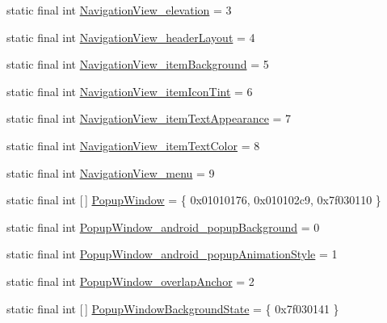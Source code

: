 \begin{DoxyCompactItemize}
\item 
static final int \mbox{\hyperlink{classandroid_1_1support_1_1design_1_1R_1_1styleable_a701f3045d0bea3a251d0ea6d82edf2ad}{Navigation\+View\+\_\+elevation}} = 3
\item 
static final int \mbox{\hyperlink{classandroid_1_1support_1_1design_1_1R_1_1styleable_a4e6b4e11c802a6a9013ba362fd46e781}{Navigation\+View\+\_\+header\+Layout}} = 4
\item 
static final int \mbox{\hyperlink{classandroid_1_1support_1_1design_1_1R_1_1styleable_ae51d9828828f318e95b0513f0432ca4c}{Navigation\+View\+\_\+item\+Background}} = 5
\item 
static final int \mbox{\hyperlink{classandroid_1_1support_1_1design_1_1R_1_1styleable_a2dbe4842476f6cbd848e05031cd5d92f}{Navigation\+View\+\_\+item\+Icon\+Tint}} = 6
\item 
static final int \mbox{\hyperlink{classandroid_1_1support_1_1design_1_1R_1_1styleable_af3af58f69e672c5e0c03df4c759b7c43}{Navigation\+View\+\_\+item\+Text\+Appearance}} = 7
\item 
static final int \mbox{\hyperlink{classandroid_1_1support_1_1design_1_1R_1_1styleable_a4c70373033dbbc3f671832143e22c0b0}{Navigation\+View\+\_\+item\+Text\+Color}} = 8
\item 
static final int \mbox{\hyperlink{classandroid_1_1support_1_1design_1_1R_1_1styleable_a028c10ccff368a73e6280a6f7ff22053}{Navigation\+View\+\_\+menu}} = 9
\item 
static final int \mbox{[}$\,$\mbox{]} \mbox{\hyperlink{classandroid_1_1support_1_1design_1_1R_1_1styleable_aa75bc963c35e5bb705cefe081e851f59}{Popup\+Window}} = \{ 0x01010176, 0x010102c9, 0x7f030110 \}
\item 
static final int \mbox{\hyperlink{classandroid_1_1support_1_1design_1_1R_1_1styleable_ad6a7bb695118202b71eb597719a36bd2}{Popup\+Window\+\_\+android\+\_\+popup\+Background}} = 0
\item 
static final int \mbox{\hyperlink{classandroid_1_1support_1_1design_1_1R_1_1styleable_a07d7a32addec590fa21453ee5369adcc}{Popup\+Window\+\_\+android\+\_\+popup\+Animation\+Style}} = 1
\item 
static final int \mbox{\hyperlink{classandroid_1_1support_1_1design_1_1R_1_1styleable_afe1e929b18fc439ef8499d628296a0e3}{Popup\+Window\+\_\+overlap\+Anchor}} = 2
\item 
static final int \mbox{[}$\,$\mbox{]} \mbox{\hyperlink{classandroid_1_1support_1_1design_1_1R_1_1styleable_a0fa0763898706ab0c593a428f940c3e1}{Popup\+Window\+Background\+State}} = \{ 0x7f030141 \}

\end{DoxyCompactItemize}
